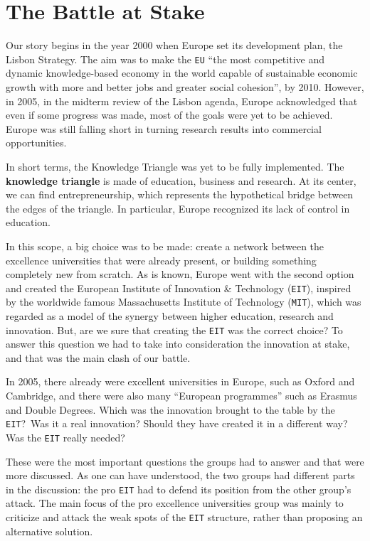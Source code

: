 \documentclass[11pt,a4paper,oneside,twocolumn]{IEEEtran}
\begin{document}
\section{The Battle at Stake}
Our story begins in the year 2000 when Europe set its development plan, the Lisbon Strategy. The aim was to make the \texttt{EU} ``the most competitive and dynamic knowledge-based economy in the world capable of sustainable economic growth with more and better jobs and greater social cohesion''\cite{3_1}, by 2010. However, in 2005, in the midterm review of the Lisbon agenda, Europe acknowledged that even if some progress was made, most of the goals were yet to be achieved. Europe was still falling short in turning research results into commercial opportunities.

In short terms, the Knowledge Triangle was yet to be fully implemented. The \textbf{knowledge triangle} is made of education, business and research. At its center, we can find entrepreneurship, which represents the hypothetical bridge between the edges of the triangle. In particular, Europe recognized its lack of control in education.

In this scope, a big choice was to be made: create a network between the excellence universities that were already present, or building something completely new from scratch. As is known, Europe went with the second option and created the European Institute of Innovation \& Technology (\texttt{EIT}), inspired by the worldwide famous Massachusetts Institute of Technology (\texttt{MIT}), which was regarded as a model of the synergy between higher education, research and innovation. But, are we sure that creating the \texttt{EIT} was the correct choice? To answer this question we had to take into consideration the innovation at stake, and that was the main clash of our battle.

In 2005, there already were excellent universities in Europe, such as Oxford and Cambridge, and there were also many ``European programmes'' such as Erasmus and Double Degrees.
Which was the innovation brought to the table by the \texttt{EIT}?\ Was it a real innovation? Should they have created it in a different way? Was the \texttt{EIT} really needed?

These were the most important questions the groups had to answer and that were more discussed. As one can have understood, the two groups had different parts in the discussion: the pro \texttt{EIT} had to defend its position from the other group's attack. The main focus of the pro excellence universities group was mainly to criticize and attack the weak spots of the \texttt{EIT} structure, rather than proposing an alternative solution.
\end{document}
